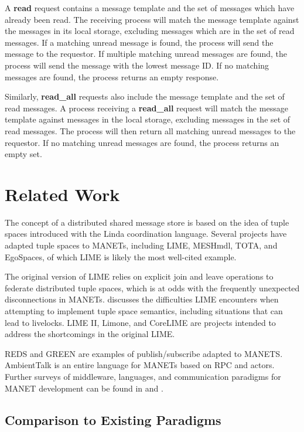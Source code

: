 \documentclass{llncs}
\begin{document}
A \textbf{read} request contains a message template and the set of messages which have already been read. The receiving process will match the message template against the messages in its local storage, excluding messages which are in the set of read messages. If a matching unread message is found, the process will send the message to the requestor. If multiple matching unread messages are found, the process will send the message with the lowest message ID. If no matching messages are found, the process returns an empty response.

Similarly, \textbf{read\_all} requests also include the message template and the set of read messages. A process receiving a \textbf{read\_all} request will match the message template against messages in the local storage, excluding messages in the set of read messages. The process will then return all matching unread messages to the requestor. If no matching unread messages are found, the process returns an empty set.

\section{Related Work}\label{sec:relatedwork}

The concept of a distributed shared message store is based on the idea of tuple spaces introduced with the Linda\cite{linda} coordination language. Several projects have adapted tuple spaces to MANETs, including LIME\cite{lime}, MESHmdl\cite{meshmdl}, TOTA\cite{tota}, and EgoSpaces\cite{egospaces}, of which LIME is likely the most well-cited example.

The original version of LIME relies on explicit join and leave operations to federate distributed tuple spaces, which is at odds with the frequently unexpected disconnections in MANETs. \cite{limerevisted} discusses the difficulties LIME encounters when attempting to implement tuple space semantics, including situations that can lead to livelocks. LIME II\cite{lime2}, Limone\cite{limone}, and CoreLIME\cite{corelime} are projects intended to address the shortcomings in the original LIME.

REDS\cite{reds} and GREEN\cite{green} are examples of publish/subscribe adapted to MANETS. AmbientTalk\cite{ambienttalk} is an entire language for MANETs based on RPC and actors. Further surveys of middleware, languages, and communication paradigms for MANET development can be found in \cite{mine} and \cite{mwtrends}.

\subsection{Comparison to Existing Paradigms}
\end{document}
